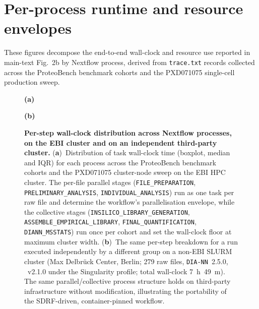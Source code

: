 \documentclass[preprint,12pt]{elsarticle}
\begin{document}
\section{Per-process runtime and resource envelopes}
\label{sec:supp-performance}

These figures decompose the end-to-end wall-clock and resource use reported in main-text Fig.~2b by Nextflow process, derived from \texttt{trace.txt} records collected across the ProteoBench benchmark cohorts and the PXD071075 single-cell production sweep.

\begin{figure}[htbp]
  \centering
  \begin{minipage}[t]{0.49\textwidth}
    \centering
    \textbf{(a)}\par\vspace{0.1em}
  \end{minipage}\hfill
  \begin{minipage}[t]{0.49\textwidth}
    \centering
    \textbf{(b)}\par\vspace{0.1em}
  \end{minipage}
  \caption[Per-step runtime]{%
    \textbf{Per-step wall-clock distribution across Nextflow processes, on the
    EBI cluster and on an independent third-party cluster.}
    (\textbf{a})~Distribution of task wall-clock time (boxplot, median and IQR)
    for each \quantmsdiann{} process across the ProteoBench benchmark cohorts
    and the PXD071075 cluster-node sweep on the EBI HPC cluster. The per-file
    parallel stages (\texttt{FILE\_PREPARATION}, \texttt{PRELIMINARY\_ANALYSIS},
    \texttt{INDIVIDUAL\_ANALYSIS}) run as one task per raw file and determine
    the workflow's parallelisation envelope, while the collective stages
    (\texttt{INSILICO\_LIBRARY\_GENERATION},
    \texttt{ASSEMBLE\_EMPIRICAL\_LIBRARY}, \texttt{FINAL\_QUANTIFICATION},
    \texttt{DIANN\_MSSTATS}) run once per cohort and set the wall-clock floor
    at maximum cluster width.
    (\textbf{b})~The same per-step breakdown for a \quantmsdiann{} run executed
    independently by a different group on a non-EBI SLURM cluster (Max
    Delbr\"{u}ck Center, Berlin; 279 raw files, \texttt{DIA-NN}~2.5.0,
    \quantmsdiann{}~v2.1.0 under the Singularity profile; total wall-clock
    7~h~49~m). The same parallel/collective process structure holds on
    third-party infrastructure without modification, illustrating the
    portability of the SDRF-driven, container-pinned workflow.
  }
  \label{fig:runtime-per-step}
\end{figure}
\end{document}
